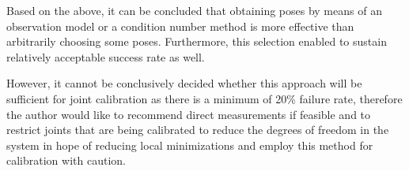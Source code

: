 \documentclass[english, printversion, nomenclature, notitle]{tuvisionthesis} %
\begin{document}
Based on the above, it can be concluded that obtaining poses by means of an observation model or a condition number method is more effective than arbitrarily choosing some poses. Furthermore, this selection enabled to sustain relatively acceptable success rate as well. 

However, it cannot be conclusively decided whether this approach will be sufficient for joint calibration as there is a minimum of 20\% failure rate, therefore the author would like to recommend direct measurements if feasible and to restrict joints that are being calibrated to reduce the degrees of freedom in the system in hope of reducing local minimizations and employ this method for calibration with caution.


{}
\end{document}
